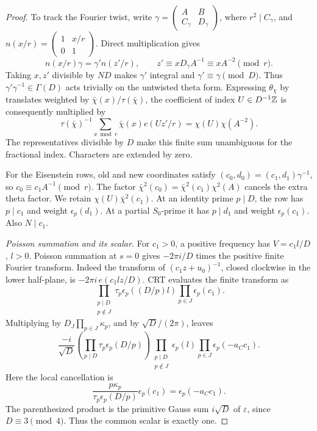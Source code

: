 \begin{proof}
To track the Fourier twist, write
\(\gamma=\left(\begin{smallmatrix}A&B\\C_\gamma&D_\gamma\end{smallmatrix}\right)\),
where \(r^2\mid C_\gamma\), and
\(n(x/r)=\left(\begin{smallmatrix}1&x/r\\0&1\end{smallmatrix}\right)\).
Direct multiplication gives
\[
 n(x/r)\gamma=\gamma'n(z'/r),\qquad
 z'\equiv xD_\gamma A^{-1}\equiv xA^{-2}\pmod r.
\]
Taking \(x,z'\) divisible by \(ND\) makes \(\gamma'\) integral and
\(\gamma'\equiv\gamma\pmod D\). Thus
\(\gamma'\gamma^{-1}\in\Gamma(D)\) acts trivially on the untwisted
theta form. Expressing \(\theta_\chi\) by translates weighted by
\(\bar\chi(x)/\tau(\bar\chi)\), the coefficient of index
\(U\in D^{-1}\mathbb Z\) is consequently multiplied by
\[
 \tau(\bar\chi)^{-1}\sum_{x\bmod r}\bar\chi(x)e(Uz'/r)
   =\chi(U)\chi(A^{-2}).
\]
The representatives divisible by \(D\) make this finite sum
unambiguous for the fractional index. Characters are extended by zero.

For the Eisenstein rows, old and new coordinates satisfy
\((c_0,d_0)=(c_1,d_1)\gamma^{-1}\), so
\(c_0\equiv c_1A^{-1}\pmod r\).
The factor \(\bar\chi^2(c_0)=\bar\chi^2(c_1)\chi^2(A)\)
cancels the extra theta factor. We retain
\(\chi(U)\bar\chi^2(c_1)\).
At an identity prime \(p\mid D\), the row has \(p\mid c_1\)
and weight \(\epsilon_p(d_1)\). At a partial \(S_0\)-prime it has
\(p\mid d_1\) and weight \(\epsilon_p(c_1)\). Also \(N\mid c_1\).

\emph{Poisson summation and its scalar.}
For \(c_1>0\), a positive frequency has
\(V=c_1l/D\), \(l>0\). Poisson summation at \(s=0\) gives
\(-2\pi i/D\) times the positive finite Fourier transform.
Indeed the transform of \((c_1z+u_0)^{-1}\), closed clockwise
in the lower half-plane, is \(-2\pi i\,e(c_1lz/D)\).
CRT evaluates the finite transform as
\[
 \prod_{\substack{p\mid D\\p\notin J}}\tau_p\epsilon_p((D/p)l)
       \prod_{p\in J}\epsilon_p(c_1).
\]
Multiplying by \(D_J\prod_{p\in J}\kappa_p\), and by
\(\sqrt D/(2\pi)\), leaves
\[
 \frac{-i}{\sqrt D}
 \left(\prod_{p\mid D}\tau_p\epsilon_p(D/p)\right)
 \prod_{\substack{p\mid D\\p\notin J}}\epsilon_p(l)
 \prod_{p\in J}\epsilon_p(-a_Cc_1).
\]
Here the local cancellation is
\[
 \frac{p\kappa_p}{\tau_p\epsilon_p(D/p)}\epsilon_p(c_1)
       =\epsilon_p(-a_Cc_1).
\]
The parenthesized product is the primitive Gauss sum
\(i\sqrt D\) of \(\varepsilon\), since \(D\equiv3\pmod4\).
Thus the common scalar is exactly one.


\end{proof}
